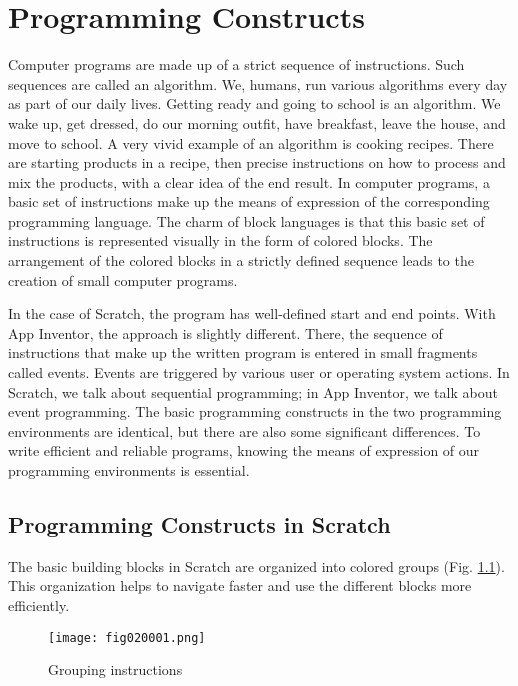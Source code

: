 \chapter{Programming Constructs}

Computer programs are made up of a strict sequence of instructions. Such sequences are called an algorithm. We, humans, run various algorithms every day as part of our daily lives. Getting ready and going to school is an algorithm. We wake up, get dressed, do our morning outfit, have breakfast, leave the house, and move to school. A very vivid example of an algorithm is cooking recipes. There are starting products in a recipe, then precise instructions on how to process and mix the products, with a clear idea of the end result. In computer programs, a basic set of instructions make up the means of expression of the corresponding programming language. The charm of block languages is that this basic set of instructions is represented visually in the form of colored blocks. The arrangement of the colored blocks in a strictly defined sequence leads to the creation of small computer programs.

In the case of Scratch, the program has well-defined start and end points. With App Inventor, the approach is slightly different. There, the sequence of instructions that make up the written program is entered in small fragments called events. Events are triggered by various user or operating system actions. In Scratch, we talk about sequential programming; in App Inventor, we talk about event programming. The basic programming constructs in the two programming environments are identical, but there are also some significant differences. To write efficient and reliable programs, knowing the means of expression of our programming environments is essential. 

\section{Programming Constructs in Scratch}

The basic building blocks in Scratch are organized into colored groups (Fig. \ref{fig020001}). This organization helps to navigate faster and use the different blocks more efficiently.

\begin{figure}[H]
   \centering
   \texttt{[image: fig020001.png]}
   \caption{Grouping instructions}
\label{fig020001}
\end{figure}

